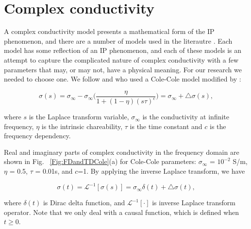\documentclass[extra,mreferee]{gji}
\newcommand{\siginf}{\sigma_\infty}
\begin{document}
\section{Complex conductivity}
A complex conductivity model presents a mathematical form of the IP phenomenon, and there are a number of models used in the literautre \cite[]{Dias2000,Tarasov2013}. Each model has some reflection of an IP phenomenon, and each of these models is an attempt to capture the complicated nature of complex conductivity with a few parameters that may, or may not, have a physical meaning. For our research we needed to choose one. We follow \cite{Smith1988a} and \cite{Marchant2014} who used a Cole-Cole model \cite[]{COLE} modified by \cite{Pelton1978}:
\begin{linenomath*}
\begin{equation}
  \sigma(s) = \sigma_{\infty} - \sigma_{\infty}\Big(\frac{\eta}{1+(1-\eta)(s \tau)^c}\Big) = \sigma_{\infty} + \triangle\sigma(s),
  \label{eq: sigma_freq}
\end{equation}
\end{linenomath*}
where $s$ is the Laplace transform variable, $\sigma_{\infty}$ is the conductivity at infinite frequency, $\eta$ is the intrinsic chareability, $\tau$ is the time constant and $c$ is the frequency dependency.


Real and imaginary parts of complex conductivity in the frequency domain are shown in Fig. ~\ref{Fig:FDandTDCole}(a) for Cole-Cole parameters: $\siginf$ = $10^{-2}$ S/m, $\eta $ = 0.5, $\tau$ = 0.01s, and $c$=1.
By applying the inverse Laplace transform, we have
\begin{linenomath*}
\begin{equation}
  \sigma(t) = \mathscr{L}^{-1}[\sigma(s)] = \sigma_{\infty}\delta(t) + \triangle\sigma(t),
  \label{eq: sigma_time}
\end{equation}
\end{linenomath*}
where $\delta(t)$ is Dirac delta function, and $\mathscr{L}^{-1}[\cdot]$ is inverse Laplace transform operator. Note that we only deal with a causal function, which is defined when $t\ge 0$.
\end{document}
